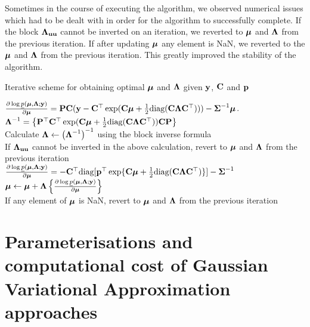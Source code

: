 	Sometimes in the course of  executing the algorithm, we observed numerical issues which had to be dealt
	with in order for the algorithm to successfully complete. If the block ${\boldsymbol \Lambda}_{{\bf u} {\bf u}}$ cannot be inverted on an
	iteration, we reverted to ${\boldsymbol \mu}$ and ${\boldsymbol \Lambda}$ from the previous iteration. If after updating ${\boldsymbol \mu}$
	any element is NaN, we reverted to the ${\boldsymbol \mu}$ and ${\boldsymbol \Lambda}$ from the previous iteration. This greatly
	improved the stability of the algorithm.
	
	\begin{algorithm}
		\caption[Algorithm GVA NR]{Iterative scheme for obtaining optimal ${\boldsymbol \mu}$ and ${\boldsymbol \Lambda}$
			given ${\bf y}$, ${\bf C}$ and ${\bf p}$}
		\label{alg:algorithm_nr}
		\begin{algorithmic}
			\REQUIRE $\frac{\partial \log \underline{p}({\boldsymbol \mu}, {\boldsymbol \Lambda}; {\bf y})}{\partial {\boldsymbol\mu}} = {\bf P} {\bf C} ({\bf y} - {\bf C}^\top \exp({\bf C} {\boldsymbol \mu} + \frac{1}{2} \text{diag}{({\bf C}{\boldsymbol\Lambda}{\bf C}^\top)})) - {\boldsymbol \Sigma}^{-1} {\boldsymbol \mu}$.
			\STATE ${\boldsymbol \Lambda}^{-1} = \left \{ {\bf P}^\top {\bf C}^\top \exp({\bf C} {\boldsymbol \mu} + \frac{1}{2} \text{diag}({\bf C} {\boldsymbol \Lambda} {\bf C}^\top)) {\bf C} {\bf P} \right \}$ \\ [1ex]
			Calculate \STATE ${\boldsymbol \Lambda} \leftarrow \left ({\boldsymbol \Lambda}^{-1} \right )^{-1}$  using the block inverse formula \\ [1ex]
			If ${\boldsymbol \Lambda}_{{\bf u} {\bf u}}$ cannot be inverted in the above calculation, revert to ${\boldsymbol \mu}$ and ${\boldsymbol \Lambda}$ from the previous iteration \\ [1ex]
			\STATE $\frac{\partial \log \underline{p}({\boldsymbol \mu}, {\boldsymbol \Lambda}; {\bf y})}{\partial {\boldsymbol\mu}} = -{\bf C}^\top \text{diag}[{\bf p}^\top \exp\{{\bf C} {\boldsymbol \mu} + \frac{1}{2} \text{diag}({\bf C} {\boldsymbol \Lambda} {\bf C}^\top)\}] - {\boldsymbol \Sigma}^{-1}$ \\ [1ex]
			\STATE ${\boldsymbol \mu} \leftarrow {\boldsymbol\mu} + {\boldsymbol \Lambda} \left \{ \frac{\partial \log \underline{p}({\boldsymbol \mu}, {\boldsymbol \Lambda}; {\bf y})}{\partial {\boldsymbol\mu}} \right \}$ \\ [1ex]
			If any element of ${\boldsymbol \mu}$ is NaN, revert to ${\boldsymbol \mu}$ and ${\boldsymbol \Lambda}$ from the previous iteration
			\ENDWHILE
		\end{algorithmic}
	\end{algorithm}
			
			
	\section{Parameterisations and computational cost of Gaussian Variational Approximation approaches}
	\label{sec:param}
